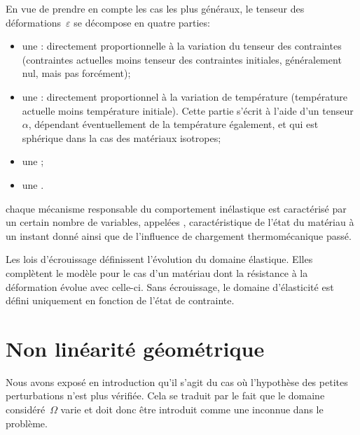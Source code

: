 \bigskip
En vue de prendre en compte les cas les plus généraux, le tenseur des déformations~$\varepsilon$ se décompose en quatre parties:
\begin{itemize}
	\item une : directement proportionnelle à la variation du tenseur des contraintes (contraintes actuelles moins tenseur des contraintes initiales, généralement nul, mais pas forcément);
	\item une : directement proportionnel à la variation de température (température actuelle moins température initiale). Cette partie s'écrit à l'aide d'un tenseur~$\alpha$, dépendant éventuellement de la température également, et qui est sphérique dans la cas des matériaux isotropes;
	\item une ;
	\item une .
\end{itemize}

\medskip
chaque mécanisme responsable du comportement inélastique est caractérisé par un certain nombre de variables, appelées , caractéristique de l'état du matériau à un instant donné ainsi que de l'influence de chargement thermomécanique passé.

Les lois d'écrouissage définissent l'évolution du domaine élastique. Elles complètent le modèle pour le cas d'un matériau dont la résistance à la déformation évolue avec celle-ci. Sans écrouissage, le domaine d'élasticité est défini uniquement en fonction de l'état de contrainte.






\medskip
\section{Non linéarité géométrique}\label{Sec-NLg}

Nous avons exposé en introduction qu'il s'agit du cas où l'hypothèse des petites perturbations n'est plus vérifiée. Cela se traduit par le fait que le domaine considéré~$\Omega$ varie et doit donc être introduit comme une inconnue dans le problème.

